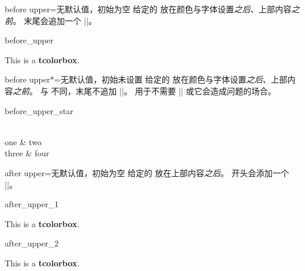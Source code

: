 \clearpage
\begin{docTcbKey}{before upper}{=}{无默认值，初始为空}
  给定的  放在颜色与字体设置\emph{之后}、上部内容\emph{之前}。
   末尾会追加一个 |\ignorespaces|。
\begin{exdispExample}{before_upper}

\begin{tcolorbox}[title=My title]
This is a \textbf{tcolorbox}.
\end{tcolorbox}
\end{exdispExample}
\end{docTcbKey}


\begin{docTcbKey}[][doc new=2019-02-26]{before upper*}{=}{无默认值，初始未设置}
  给定的  放在颜色与字体设置\emph{之后}、上部内容\emph{之前}。
  与  不同，末尾不追加 |\ignorespaces|。
  用于不需要 |\ignorespaces| 或它会造成问题的场合。
\begin{exdispExample}{before_upper_star}
\begin{tcolorbox}[size=small,tile,
  colback=yellow!20,colbacktitle=yellow!70!black,
  title=My table,hbox,center,center title,
  before upper*=\begin{tabular}{cc},
  after upper*=\end{tabular},
]
  \\
  one & two \\
  three & four\\
\end{tcolorbox}
\end{exdispExample}
\end{docTcbKey}

\clearpage

\begin{docTcbKey}[][doc updated=2016-10-21]{after upper}{=}{无默认值，初始为空}
  给定的  放在上部内容\emph{之后}。
   开头会添加一个 |\unskip|。

\begin{exdispExample}{after_upper_1}

\begin{tcolorbox}[title=My title]
This is a \textbf{tcolorbox}.
\end{tcolorbox}
\end{exdispExample}

\begin{exdispExample}{after_upper_2}
\begin{tcolorbox}[before upper=\flqq,after upper=\frqq,
  colback=red!5!white,colframe=red!75!black]
This is a \textbf{tcolorbox}.
\end{tcolorbox}
\end{exdispExample}
\end{docTcbKey}


